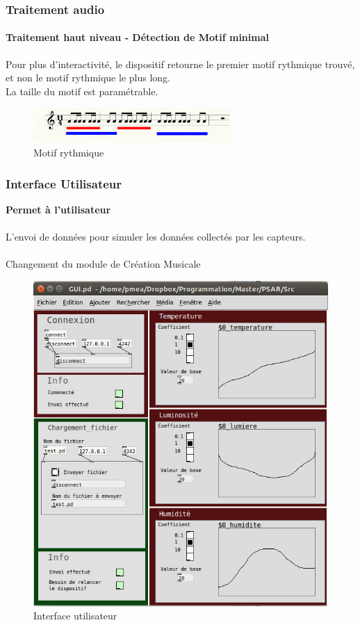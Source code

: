 \documentclass{beamer}
\begin{document}
\begin{frame}
\frametitle{Traitement audio}
\framesubtitle{Traitement haut niveau - Détection de Motif minimal}
Pour plus d'interactivité, le dispositif retourne le premier motif rythmique trouvé, et non le motif rythmique le plus long.\\
La taille du motif est paramétrable.
\begin{figure}
\centering
\includegraphics[height=50px]{motifrythme.jpg}
\caption{Motif rythmique}
\end{figure}
\end{frame}


\begin{frame}
\frametitle{Interface Utilisateur}
\begin{minipage}{0.49\textwidth}
\textbf{Permet à l'utilisateur}\\\\
L'envoi de données pour simuler les données collectés par les capteurs.\\\\
Changement du module de Création Musicale
\end{minipage}
\begin{minipage}{0.49\textwidth}
\begin{figure}
  \centering
  \includegraphics[width=\textwidth]{GUI.jpg} 
	\caption{Interface utilisateur}
\end{figure}
\end{minipage}
\end{frame}
\end{document}
